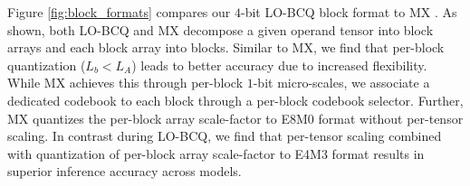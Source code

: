 Figure \ref{fig:block_formats} compares our $4$-bit LO-BCQ block format to MX \citep{rouhani2023microscaling}. As shown, both LO-BCQ and MX decompose a given operand tensor into block arrays and each block array into blocks. Similar to MX, we find that per-block quantization ($L_b < L_A$) leads to better accuracy due to increased flexibility. While MX achieves this through per-block $1$-bit micro-scales, we associate a dedicated codebook to each block through a per-block codebook selector. Further, MX quantizes the per-block array scale-factor to E8M0 format without per-tensor scaling. In contrast during LO-BCQ, we find that per-tensor scaling combined with quantization of per-block array scale-factor to E4M3 format results in superior inference accuracy across models. 
